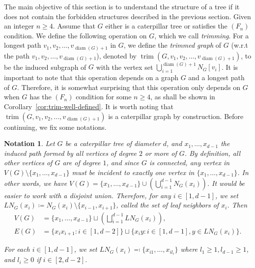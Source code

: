 \documentclass{amsart}
\newtheorem{notation}[theorem]{Notation}
\theoremstyle{remark}
\theoremstyle{definition}
\DeclareMathOperator{\diam}{diam}
\DeclareMathOperator{\trim}{trim}
\begin{document}
	
	The main objective of this section is to understand the structure of a tree if it does not contain the forbidden structures described in the previous section. Given an integer $n\geq 4$. Assume that $G$ either is a caterpillar tree or satisfies the $(F_n)$ condition. We define the following operation on $G$, which we call \emph{trimming}. For a longest path $v_1, v_2,\dots, v_{\diam(G)+1}$ in $G$, we define the \emph{trimmed graph} of $G$ (w.r.t the path $v_1, v_2,\dots, v_{\diam(G)+1}$), denoted by $\trim(G,v_1,v_2,\dots, v_{\diam(G)+1})$, to be the induced subgraph of $G$ with the vertex set $\bigcup_{i=1}^{\diam(G)+1} N_G[v_i]$. It is important to note that this operation depends on a graph $G$ and a longest path of $G$. Therefore,  it is somewhat surprising that this operation only depends on $G$ when $G$ has the $(F_n)$ condition for some $n\geq 4$, as shall be shown in Corollary~\ref{cor:trim-well-defined}. It is worth noting that $\trim(G,v_1,v_2,\dots, v_{\diam(G)+1})$ is a caterpillar graph by construction. Before continuing, we fix some notations.
	\begin{notation}\label{nota:caterpillar}\normalfont
		Let $G$ be a caterpillar tree of diameter $d$, and $x_1,\dots, x_{d-1}$ the induced path formed by all vertices of degree $2$ or more of $G$. By definition, all other vertices of $G$ are of degree $1$, and since $G$ is connected, any vertex in $V(G)\setminus \{x_1,\dots, x_{d-1}\}$ must be incident to exactly one vertex in $\{x_1,\dots, x_{d-1}\}$. In other words, we have $V(G)=\{x_1,\dots, x_{d-1}\}\cup \left(\bigcup_{i=1}^{d-1} N_G(x_i) \right)$. It would be easier to work with a disjoint union. Therefore, for any $i\in[1,d-1]$, we set $LN_G(x_i)\coloneqq N_G(x_i)\setminus \{x_{i-1},x_{i+1}\}$, called the set of \emph{leaf neighbors} of $x_i$. Then
		\begin{align*}
		    V(G)&= \{x_1,\dots, x_{d-1}\}\sqcup \left(\bigsqcup_{i=1}^{d-1} LN_G(x_i) \right),\\
		E(G)&= \{ x_ix_{i+1}\colon i\in [1,d-2] \}\sqcup \{x_iy\colon i\in [1,d-1], y\in  LN_G(x_i)\}.
		\end{align*}
		
		
		For each $i\in [1,d-1]$, we set $LN_G(x_i)\eqqcolon\{x_{i1},\dots, x_{il_i}\}$ where $l_1\geq 1, l_{d-1}\geq 1$, and $l_i\geq 0$ if $i\in[2,d-2]$.
	\end{notation}
	
\end{document}
